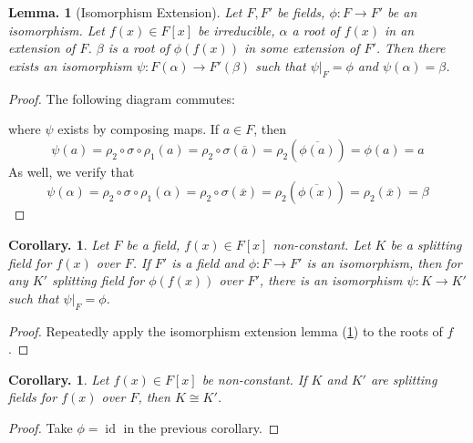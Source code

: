 \documentclass[11pt, a4paper]{memoir}
\newcommand{\brac}[1]{\ensuremath{\left\langle #1 \right\rangle}}
\theoremstyle{change}
\newtheorem{lemma}[theorem]{Lemma.}
\newtheorem{corollary}[theorem]{Corollary.}
\theoremstyle{plain}
\theoremstyle{nonumberplain}
\newtheorem{proof}{Proof}
\DeclareMathOperator{\id}{id}
\newcommand{\quot}[2]{\mathchoice{\left.\raisebox{0.14em}{$#1$}\middle/\raisebox{-0.14em}{$#2$}\right.}
                                 {\left.\raisebox{0.08em}{$#1$}\middle/\raisebox{-0.08em}{$#2$}\right.}
                                 {\left.\raisebox{0.03em}{$#1$}\middle/\raisebox{-0.03em}{$#2$}\right.}
                                 {\left.\raisebox{0em}{$#1$}\middle/\raisebox{0em}{$#2$}\right.}}
\numberwithin{equation}{section}
\begin{document}
\begin{lemma}[Isomorphism Extension]\label{lem:iso-ext}
    Let $F,F'$ be fields, $\phi:F\to F'$ be an isomorphism.
    Let $f(x)\in F[x]$ be irreducible, $\alpha$ a root of $f(x)$ in an extension of $F$.
    $\beta$ is a root of $\phi(f(x))$ in some extension of $F'$.
    Then there exists an isomorphism $\psi:F(\alpha)\to F'(\beta)$ such that $\psi|_F=\phi$ and $\psi(\alpha)=\beta$.
\end{lemma}
\begin{proof}
    The following diagram commutes:
    \begin{center}
    \end{center}
    where $\psi$ exists by composing maps.
    If $a\in F$, then
    \begin{equation*}
        \psi(a)=\rho_2\circ\sigma\circ\rho_1(a)=\rho_2\circ\sigma(\overline{a})=\rho_2(\overline{\phi(a)})=\phi(a)=a
    \end{equation*}
    As well, we verify that
    \begin{equation*}
        \psi(\alpha)=\rho_2\circ\sigma\circ\rho_1(\alpha)=\rho_2\circ\sigma(\overline{x})=\rho_2(\overline{\phi(x)})=\rho_2(\overline{x})=\beta
    \end{equation*}
\end{proof}
\begin{corollary}
    Let $F$ be a field, $f(x)\in F[x]$ non-constant.
    Let $K$ be a splitting field for $f(x)$ over $F$.
    If $F'$ is a field and $\phi:F\to F'$ is an isomorphism, then for any $K'$ splitting field for $\phi(f(x))$ over $F'$, there is an isomorphism $\psi:K\to K'$ such that $\psi|_F=\phi$.
\end{corollary}
\begin{proof}
    Repeatedly apply the isomorphism extension lemma (\cref{lem:iso-ext}) to the roots of $f$.
\end{proof}
\begin{corollary}
    Let $f(x)\in F[x]$ be non-constant.
    If $K$ and $K'$ are splitting fields for $f(x)$ over $F$, then $K\cong K'$.
\end{corollary}
\begin{proof}
    Take $\phi=\id$ in the previous corollary.
\end{proof}
\end{document}
